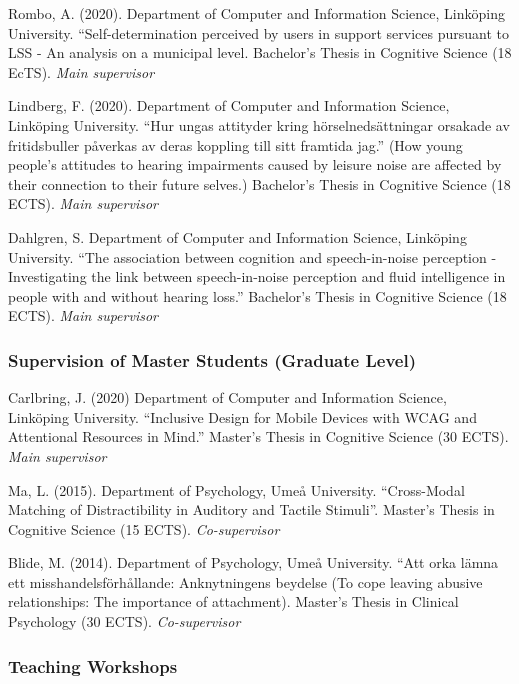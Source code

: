 \documentclass[]{article}
\begin{document}
Rombo, A. (2020). Department of Computer and Information Science,
Linköping University. ``Self-determination perceived by users in support
services pursuant to LSS - An analysis on a municipal level. Bachelor's
Thesis in Cognitive Science (18 EcTS). \emph{Main supervisor}

Lindberg, F. (2020). Department of Computer and Information Science,
Linköping University. ``Hur ungas attityder kring hörselnedsättningar
orsakade av fritidsbuller påverkas av deras koppling till sitt framtida
jag.'' (How young people's attitudes to hearing impairments caused by
leisure noise are affected by their connection to their future selves.)
Bachelor's Thesis in Cognitive Science (18 ECTS). \emph{Main supervisor}

Dahlgren, S. Department of Computer and Information Science, Linköping
University. ``The association between cognition and speech-in-noise
perception - Investigating the link between speech-in-noise perception
and fluid intelligence in people with and without hearing loss.''
Bachelor's Thesis in Cognitive Science (18 ECTS). \emph{Main supervisor}

\hypertarget{supervision-of-master-students-graduate-level}{%
\subsubsection{Supervision of Master Students (Graduate
Level)}\label{supervision-of-master-students-graduate-level}}

Carlbring, J. (2020) Department of Computer and Information Science,
Linköping University. ``Inclusive Design for Mobile Devices with WCAG
and Attentional Resources in Mind.'' Master's Thesis in Cognitive
Science (30 ECTS). \emph{Main supervisor}

Ma, L. (2015). Department of Psychology, Umeå University. ``Cross-Modal
Matching of Distractibility in Auditory and Tactile Stimuli''. Master's
Thesis in Cognitive Science (15 ECTS). \emph{Co-supervisor}

Blide, M. (2014). Department of Psychology, Umeå University. ``Att orka
lämna ett misshandelsförhållande: Anknytningens beydelse (To cope
leaving abusive relationships: The importance of attachment). Master's
Thesis in Clinical Psychology (30 ECTS). \emph{Co-supervisor}

\hypertarget{teaching-workshops}{%
\subsubsection{Teaching Workshops}\label{teaching-workshops}}
\end{document}
